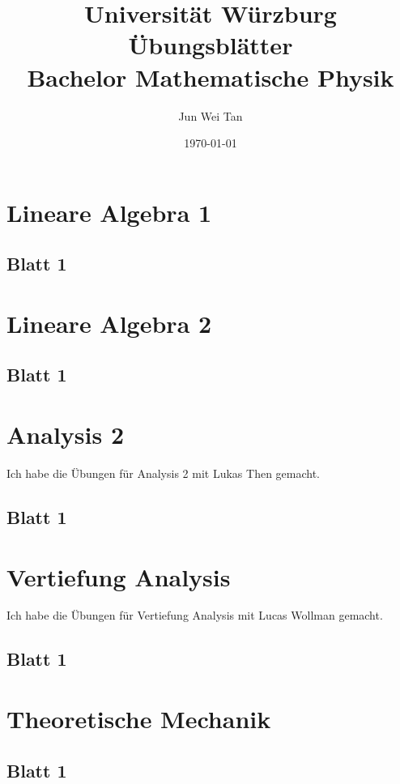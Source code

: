 \documentclass{book}
\theoremstyle{definition}
\theoremstyle{definition}
\begin{document}
	\title{Universit\"{a}t W\"{u}rzburg \"{U}bungsbl\"{a}tter\\Bachelor Mathematische Physik}
	\author{Jun Wei Tan}
	\date{\today}
	\maketitle
	\tableofcontents

\chapter{Lineare Algebra 1}
\section{Blatt 1}


\chapter{Lineare Algebra 2}
\section{Blatt 1}


\chapter{Analysis 2}
Ich habe die Übungen für Analysis 2 mit Lukas Then gemacht.
\section{Blatt 1}


\chapter{Vertiefung Analysis}
Ich habe die Übungen für Vertiefung Analysis mit Lucas Wollman gemacht.
\section{Blatt 1}


\chapter{Theoretische Mechanik}
\section{Blatt 1}

\end{document}
